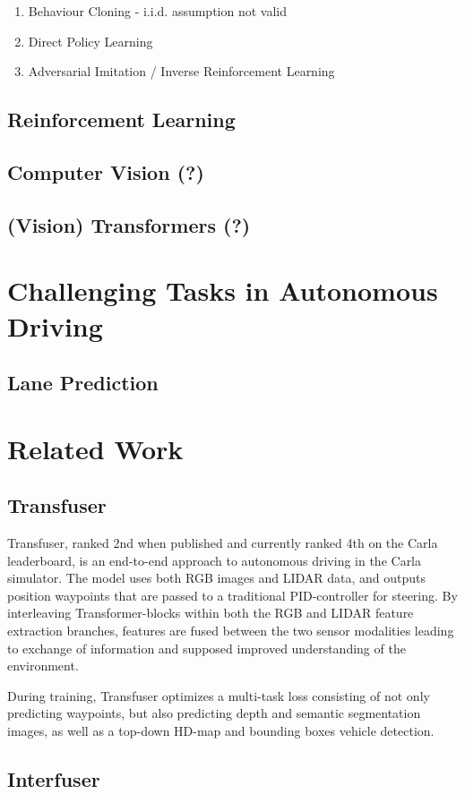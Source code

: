 \begin{enumerate}
    \item Behaviour Cloning - i.i.d. assumption not valid
    \item Direct Policy Learning
    \item Adversarial Imitation / Inverse Reinforcement Learning
\end{enumerate}

\subsection{Reinforcement Learning}

\subsection{Computer Vision (?)}

\subsection{(Vision) Transformers (?)}


\section{Challenging Tasks in Autonomous Driving}

\subsection{Lane Prediction}


\section{Related Work}

\subsection{Transfuser}
Transfuser, ranked 2nd when published and currently ranked 4th on the Carla leaderboard,
is an end-to-end approach to autonomous driving in the Carla simulator.
\cite{transfuser-pami} \cite{transfuser-cvpr} \cite{pwc-carla}
The model uses both RGB images and LIDAR data, and outputs position waypoints that are passed to a traditional PID-controller for steering.
By interleaving Transformer-blocks within both the RGB and LIDAR feature extraction branches,
features are fused between the two sensor modalities leading to exchange of information and supposed improved understanding of the environment.

During training, Transfuser optimizes a multi-task loss consisting of not only predicting waypoints,
but also predicting depth and semantic segmentation images,
as well as a top-down HD-map and bounding boxes vehicle detection.



\subsection{Interfuser}
